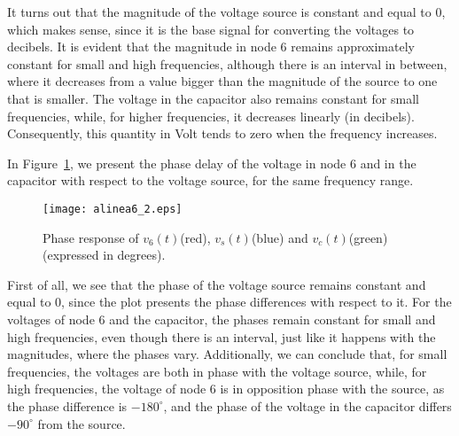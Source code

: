 It turns out that the magnitude of the voltage source is constant and equal to 0, which makes sense, since it is the base signal for converting the voltages to decibels. It is evident that the magnitude in node 6 remains approximately constant for small and high frequencies, although there is an interval in between, where it decreases from a value bigger than the magnitude of the source to one that is smaller. The voltage in the capacitor also remains constant for small frequencies, while, for higher frequencies, it decreases linearly (in decibels). Consequently, this quantity in Volt tends to zero when the frequency increases.

In Figure~\ref{fig:phase}, we present the phase delay of the voltage in node 6 and in the capacitor with respect to the voltage source, for the same frequency range.

\begin{figure}[H] \centering
\texttt{[image: alinea6\_2.eps]}
\caption{Phase response of $v_6(t)$(red), $v_s(t)$(blue) and $v_c(t)$(green) (expressed in degrees).}
\label{fig:phase}
\end{figure}

First of all, we see that the phase of the voltage source remains constant and equal to 0, since the plot presents the phase differences with respect to it. For the voltages of node 6 and the capacitor, the phases remain constant for small and high frequencies, even though there is an interval, just like it happens with the magnitudes, where the phases vary. Additionally, we can conclude that, for small frequencies, the voltages are both in phase with the voltage source, while, for high frequencies, the voltage of node 6 is in opposition phase with the source, as the phase difference is $-180^{\circ}$, and the phase of the voltage in the capacitor differs $-90^{\circ}$ from the source.

